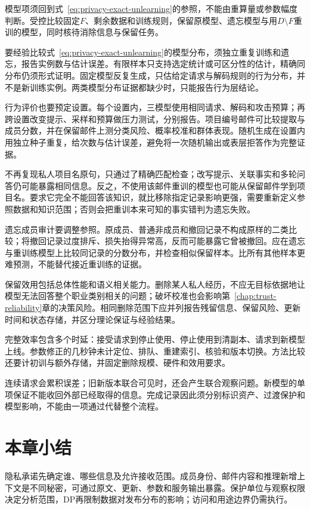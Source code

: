模型项须回到式~\eqref{eq:privacy-exact-unlearning}的参照，不能由重算量或参数幅度判断。受控比较固定$F$、剩余数据和训练规则，保留原模型、遗忘模型与用$D\setminus F$重训的模型，同时核待消除信息与保留任务。

要经验比较式~\eqref{eq:privacy-exact-unlearning}的模型分布，须独立重复训练和遗忘，报告实例数与估计误差。有限样本只支持选定统计或可区分性的估计，精确同分布仍须形式证明。固定模型反复生成，只估给定请求与解码规则的行为分布，并不是新训练实例。两类模型分布证据都缺少时，只能报告行为层结论。

行为评价也要预定设置。每个设置内，三模型使用相同请求、解码和攻击预算；再跨设置改变提示、采样和预算做压力测试，分别报告。项目编号邮件可比较提取与成员分数，并在保留邮件上测分类风险、概率校准和群体表现。随机生成在设置内用独立种子重复，给次数与估计误差，避免将一次随机输出或表层拒答作为完整证据。

不再复现私人项目名原句，只通过了精确匹配检查；改写提示、关联事实和多轮问答仍可能暴露相同信息。反之，不使用该邮件重训的模型也可能从保留邮件学到项目名。要求它完全不能回答该知识，就比移除指定记录影响更强，需要重新定义参照数据和知识范围；否则会把重训本来可知的事实错判为遗忘失败。

遗忘成员审计要调整参照。原成员、普通非成员和撤回记录不构成原样的二类比较；将撤回记录过度排斥、损失抬得异常高，反而可能暴露它曾被撤回。应在遗忘与重训练模型上比较同记录的分数分布，并检查相似保留样本。比所有其他样本更难预测，不能替代接近重训练的证据。

保留效用包括总体性能和语义相关能力。删除某人私人经历，不应无目标依据地让模型无法回答整个职业类别相关的问题；破坏校准也会影响第~\ref{chap:trust-reliability}章的决策风险。相同删除范围下应并列报告残留信息、保留风险、更新时间和状态存储，并区分理论保证与经验结果。

完整效率包含多个时延：接受请求到停止使用、停止使用到清副本、请求到新模型上线。参数修正的几秒钟未计定位、排队、重建索引、核验和版本切换。方法比较还要计初训与额外存储，并固定删除规模、硬件和效用要求。

连续请求会累积误差；旧新版本联合可见时，还会产生联合观察问题。新模型的单项保证不能收回外部已经取得的信息。完成记录因此须分别标识资产、过渡保护和模型影响，不能由一项通过代替整个流程。

\section{本章小结}
\label{sec:privacy-summary}

隐私承诺先确定谁、哪些信息及允许接收范围。成员身份、邮件内容和推理新增上下文是不同秘密，可通过原文、更新、参数和服务输出暴露。保护单位与观察权限决定分析范围，DP再限制数据对发布分布的影响；访问和用途边界仍需执行。

